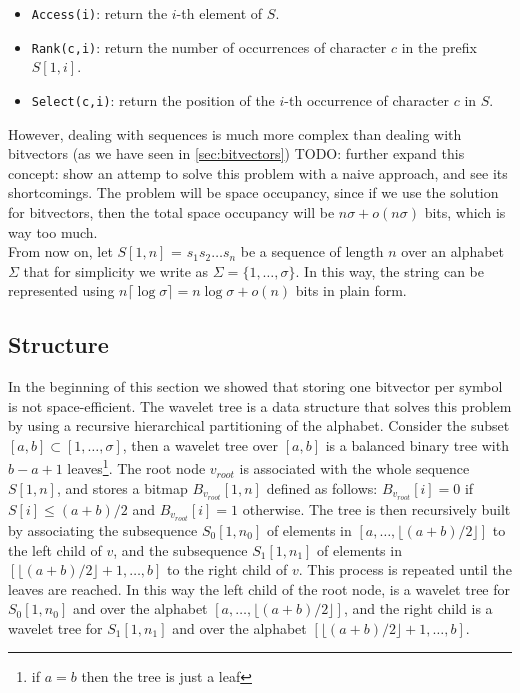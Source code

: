 \begin{itemize}
    \item \texttt{Access(i)}: return the $i$-th element of $S$.
    \item \texttt{Rank(c,i)}: return the number of occurrences of character $c$ in the prefix $S[1,i]$.
    \item \texttt{Select(c,i)}: return the position of the $i$-th occurrence of character $c$ in $S$.
\end{itemize}
However, dealing with sequences is much more complex than dealing with bitvectors (as we have seen in \autoref{sec:bitvectors})
\noindent TODO: further expand this concept: show an attemp to solve this problem with a naive approach, and see its shortcomings. The problem will be space occupancy, since if we use the solution for bitvectors, then the total space occupancy will be $n\sigma + o(n\sigma)$ bits, which is way too much. \cite{navarro2016compact} \\

\noindent From now on, let $S[1,n]$ = $s_1s_2\dots s_n$ be a sequence of length $n$ over an alphabet $\Sigma$ that for simplicity we write as $\Sigma = \{1,\dots,\sigma\}$. In this way, the string can be represented using $n \lceil \log \sigma \rceil = n \log \sigma + o(n)$ bits in plain form.

\subsection{Structure}

In the beginning of this section we showed that storing one bitvector per symbol is not space-efficient. The wavelet tree is a data structure that solves this problem by using a recursive hierarchical partitioning of the alphabet. Consider the subset $[a,b] \subset [1, \dots, \sigma]$, then a wavelet tree over $[a,b]$ is a balanced binary tree with $b-a+1$ leaves\footnote{if $a=b$ then the tree is just a leaf}. The root node $v_{root}$ is associated with the whole sequence $S[1,n]$, and stores a bitmap $B_{v_{root}}[1,n]$ defined as follows: $B_{v_{root}}[i] = 0$ if $S[i] \leq (a+b)/2$ and $B_{v_{root}}[i] = 1$ otherwise. The tree is then recursively built by associating the subsequence $S_0[1,n_0]$ of elements in $[a, \dots,\lfloor (a+b)/2 \rfloor ]$ to the left child of $v$, and the subsequence $S_1[1,n_1]$ of elements in $[\lfloor (a+b)/2 \rfloor +1,\dots, b]$ to the right child of $v$. This process is repeated until the leaves are reached. In this way the left child of the root node, is a wavelet tree for $S_0[1,n_0]$ and over the alphabet $[a,\dots, \lfloor (a+b)/2 \rfloor ]$, and the right child is a wavelet tree for $S_1[1,n_1]$ and over the alphabet $[\lfloor (a+b)/2 \rfloor +1,\dots, b]$. \cite{WTForALL}

